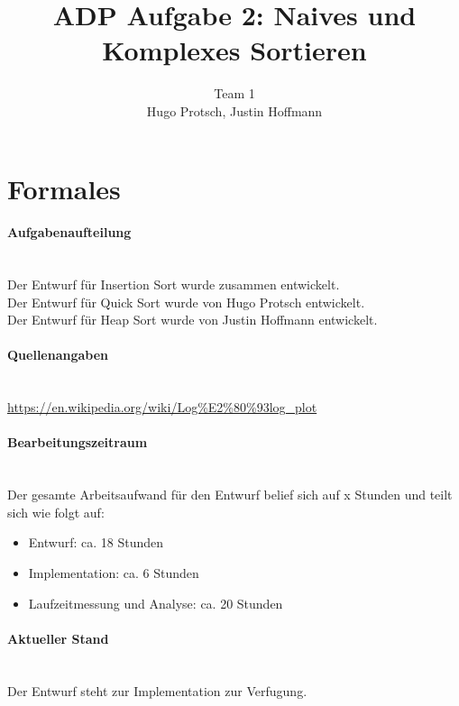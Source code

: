 \documentclass[11pt]{article}
\title{ADP Aufgabe 2: Naives und Komplexes Sortieren}
\author{Team 1\\Hugo Protsch, Justin Hoffmann}
\begin{document}
    \maketitle

    \tableofcontents

    \newpage


    \section{Formales}\label{sec:Formales}

    \paragraph*{Aufgabenaufteilung}\mbox{}\\
    Der Entwurf für Insertion Sort wurde zusammen entwickelt.\\
    Der Entwurf für Quick Sort wurde von Hugo Protsch entwickelt.\\
    Der Entwurf für Heap Sort wurde von Justin Hoffmann entwickelt.

    \paragraph*{Quellenangaben}\mbox{}\\
    \url{https://en.wikipedia.org/wiki/Log%
    }

    \paragraph*{Bearbeitungszeitraum}\mbox{}\\
    Der gesamte Arbeitsaufwand für den Entwurf belief sich auf x Stunden%
    und teilt sich wie folgt auf:
    \begin{itemize}
        \setlength\itemsep{0em}
        \item Entwurf: ca. 18 Stunden
        \item Implementation: ca. 6 Stunden %
        \item Laufzeitmessung und Analyse: ca. 20 Stunden
    \end{itemize}

    \paragraph*{Aktueller Stand}\mbox{}\\
    Der Entwurf steht zur Implementation zur Verfugung.
\end{document}
